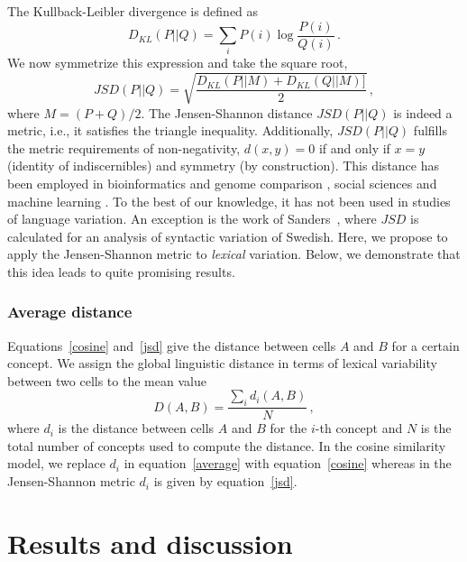 \documentclass[11pt]{article}
\begin{document}
The Kullback-Leibler divergence is defined as
\begin{equation}
D_{KL}(P||Q)=\sum_i P(i)\log\frac{P(i)}{Q(i)}\,.
\end{equation}
We now symmetrize this expression and take the square root,
\begin{equation}\label{jsd}
JSD(P||Q)=\sqrt{\frac{D_{KL}(P||M)+D_{KL}(Q||M)]}{2}}\,,
\end{equation}
where $M=(P+Q)/2$.
The Jensen-Shannon distance $JSD(P||Q)$ is indeed a metric, i.e., it satisfies the triangle inequality. Additionally,
$JSD(P||Q)$ fulfills the metric requirements of non-negativity, $d(x,y)=0$ if and only if $x=y$ (identity of indiscernibles)
and symmetry (by construction). This distance has been employed in bioinformatics and genome comparison \cite{sim09,itz10}, social sciences \cite{ded13} and machine learning \cite{goo14}. To the best of our knowledge,
it has not been used in studies of language variation. An exception is the work of Sanders~,
where $JSD$ is calculated for an analysis of syntactic variation of Swedish. Here, we propose to apply the Jensen-Shannon
metric to \textit{lexical} variation. Below, we demonstrate that this idea leads to quite promising results.

\subsubsection{Average distance}

Equations~\ref{cosine} and~\ref{jsd} give the distance between cells $A$ and $B$ for a certain concept.
We assign the global linguistic distance in terms of lexical variability between two cells to the mean value
\begin{equation}\label{average}
D(A,B)=\frac{\sum_i d_i(A,B)}{N}\,,
\end{equation}
where $d_i$ is the distance between cells $A$ and $B$ for the $i$-th concept and $N$ is the total number of concepts used to compute the distance. In the cosine similarity model, we replace $d_i$ in equation~\ref{average} with equation~\ref{cosine} whereas in the Jensen-Shannon metric $d_i$ is given by equation~\ref{jsd}.

\section{Results and discussion}
\end{document}
